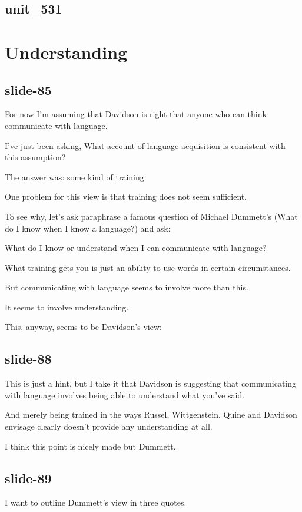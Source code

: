 \documentclass[12pt,\papersize]{extarticle}
\begin{document}
\subsection{unit\_531}
 
 
\section{Understanding}
 
\subsection{slide-85}
For now I'm assuming that Davidson is right that anyone who can think communicate with language.
 
I've just been asking, What account of language acquisition is consistent with this assumption?
 
The answer was: some kind of training.
 
One problem for this view is that training does not seem sufficient.
 
To see why, let's ask paraphrase a famous question of Michael Dummett's (What do I know when I know a language?) and ask:
 
What do I know or understand when I can communicate with language?
 
What training gets you is just an ability to use words in certain circumstances.
 
But communicating with language seems to involve more than this.
 
It seems to involve understanding.
 
This, anyway, seems to be Davidson's view:
 
\subsection{slide-88}
This is just a hint, but I take it that Davidson is suggesting that communicating with language involves being able to understand what you've said.
 
And merely being trained in the ways Russel, Wittgenstein, Quine and Davidson envisage clearly doesn't provide any understanding at all.
 
I think this point is nicely made but Dummett.
 
\subsection{slide-89}
I want to outline Dummett's view in three quotes.
 
\end{document}
